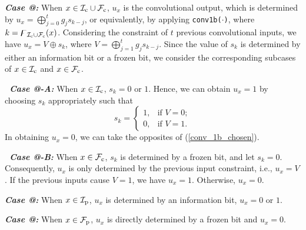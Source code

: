 \documentclass[12pt, draftclsnofoot, peerreview, onecolumn]{IEEEtran}
\makeatletter
\theoremstyle{noparent}
\newcommand{\Rmnum}[1]{\expandafter\@slowromancap\romannumeral #1@}
\makeatother
\begin{document}
\textbf{\textit{Case \Rmnum{1}:}} When $x\in \mathcal{I}_{\rm c}\cup\mathcal{F}_{\rm c}$, 
$u_x$ is the convolutional output,
which is determined by $u_x=\bigoplus_{j=0}^{t} g_{j} s_{k-j}$, or equivalently, 
by applying \texttt{conv1b($\cdot$)}, where $k=\digamma_{\mathcal{I}_{\rm c} \cup \mathcal{F}_{\rm c}}(x)$.
Considering the constraint of $t$ previous convolutional inputs, 
we have $u_x=V \oplus s_{k}$,
where $V=\bigoplus_{j=1}^{t} g_{j} s_{k-j}$.
Since the value of $s_{k}$ is determined by either an information bit or a frozen bit, 
we consider the corresponding subcases of $x\in \mathcal{I}_{\rm c}$ and $x\in \mathcal{F}_{\rm c}$.

\textbf{\textit{\ Case \Rmnum{1}-A:}} When $x\in \mathcal{I}_{\rm c}$, $s_{k}=0$ or $1$.
Hence, we can obtain $u_x=1$ by choosing
$s_{k}$ appropriately such that 
\begin{equation}
    \label{conv_1b_chosen}
    s_{k}=
    \left\{
    \begin{array}{ll}
    1, & \text {if } V=0;\\
    0, & \text {if } V=1.
    \end{array}
    \right.
\end{equation}
In obtaining $u_x=0$, we can take the opposites of (\ref{conv_1b_chosen}).

\textbf{\textit{\ Case \Rmnum{1}-B:}} When $x\in \mathcal{F}_{\rm c}$, $s_{k}$ is 
determined by a frozen bit,
and let $s_{k}=0$.
Consequently, $u_x$ is only determined by
the previous input constraint, 
i.e., $u_x=V$.
If the previous inputs cause $V=1$, we have $u_x=1$.
Otherwise, $u_x=0$.

\textbf{\textit{Case \Rmnum{2}:}} When $x\in \mathcal{I}_{\rm p}$, 
$u_x$ is determined by an information bit,
$u_x=0$ or $1$.

\textbf{\textit{Case \Rmnum{3}:}} When $x\in \mathcal{F}_{\rm p}$,
$u_x$ is directly determined by a frozen bit and $u_x=0$.
\end{document}
